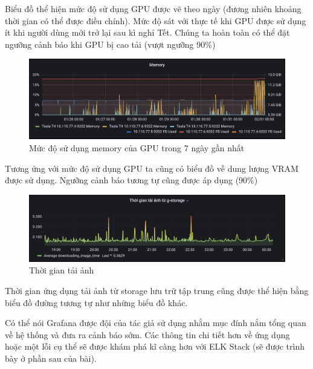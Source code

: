 Biểu đồ thể hiện mức độ sử dụng GPU được vẽ theo ngày (đương nhiên khoảng thời gian có thể được điều chính). Mức độ sát với thực tế khi GPU được sử dụng ít khi người dùng mới trở lại sau kì nghỉ Tết. Chúng ta hoàn toàn có thể đặt ngưỡng cảnh báo khi GPU bị cao tải (vượt ngưỡng 90\%)

\begin{figure}[H] %
    \centering %
    \includegraphics[width=1\textwidth]{figures/vram.png} 
    \caption{Mức độ sử dụng memory của GPU trong 7 ngày gần nhất} %
    \label{fig:elk_01}
\end{figure}

Tương ứng với mức độ sử dụng GPU ta cũng có biểu đồ về dung lượng VRAM được sử dụng. Ngưỡng cảnh báo tương tự cũng được áp dụng (90\%)

\begin{figure}[H] %
    \centering %
    \includegraphics[width=1\textwidth]{figures/download_time.png} 
    \caption{Thời gian tải ảnh} %
    \label{fig:elk_01}
\end{figure}

Thời gian ứng dụng tải ảnh từ storage lưu trữ tập trung cũng được thể hiện bằng biểu đồ đường tương tự như những biểu đồ khác. 

Có thể nói Grafana được đội của tác giả sử dụng nhằm mục đính nắm tổng quan về hệ thống và đưa ra cảnh báo sớm. Các thông tin chi tiết hơn về ứng dụng hoặc một lỗi cụ thể sẽ được khám phá kĩ càng hơn với ELK Stack (sẽ được trình bày ở phần sau của bài).
